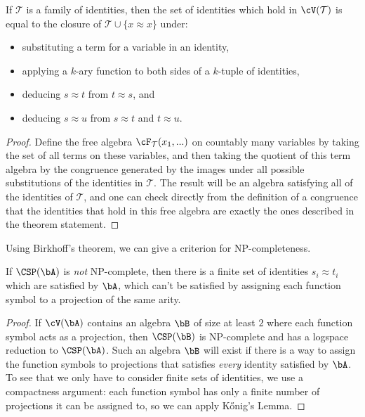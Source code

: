 \begin{thm} If $\mathcal{T}$ is a family of identities, then the set of identities which hold in $\cV(\mathcal{T})$ is equal to the closure of $\mathcal{T} \cup \{x \approx x\}$ under:
\begin{itemize}
\item substituting a term for a variable in an identity,
\item applying a $k$-ary function to both sides of a $k$-tuple of identities,
\item deducing $s\approx t$ from $t \approx s$, and
\item deducing $s \approx u$ from $s \approx t$ and $t \approx u$.
\end{itemize}
\end{thm}
\begin{proof} Define the free algebra $\cF_{\mathcal{T}}(x_1, ...)$ on countably many variables by taking the set of all terms on these variables, and then taking the quotient of this term algebra by the congruence generated by the images under all possible substitutions of the identities in $\mathcal{T}$. The result will be an algebra satisfying all of the identities of $\mathcal{T}$, and one can check directly from the definition of a congruence that the identities that hold in this free algebra are exactly the ones described in the theorem statement.
\end{proof}

Using Birkhoff's theorem, we can give a criterion for NP-completeness.

\begin{thm} If $\CSP(\bA)$ is \emph{not} NP-complete, then there is a finite set of identities $s_i \approx t_i$ which are satisfied by $\bA$, which can't be satisfied by assigning each function symbol to a projection of the same arity.
\end{thm}
\begin{proof} If $\cV(\bA)$ contains an algebra $\bB$ of size at least $2$ where each function symbol acts as a projection, then $\CSP(\bB)$ is NP-complete and has a logspace reduction to $\CSP(\bA)$. Such an algebra $\bB$ will exist if there is a way to assign the function symbols to projections that satisfies \emph{every} identity satisfied by $\bA$. To see that we only have to consider finite sets of identities, we use a compactness argument: each function symbol has only a finite number of projections it can be assigned to, so we can apply K\H{o}nig's Lemma.
\end{proof}

